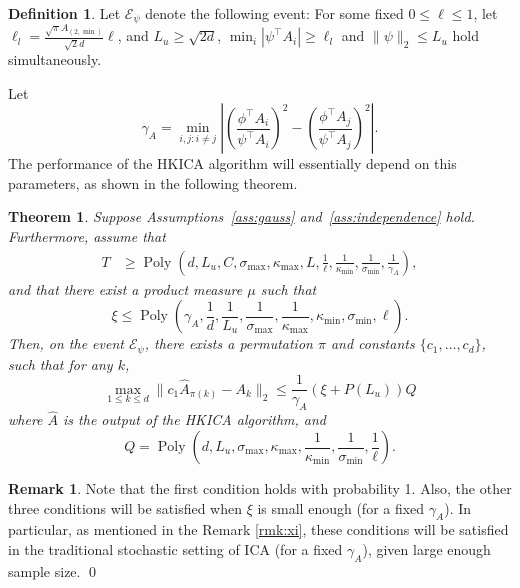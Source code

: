 \documentclass[jmlr]{article}
\newcommand{\Epsi}{\mathcal{E}_{\psi}}
\DeclareMathOperator{\pol}{Poly}
\newcommand{\poly}[1]{\pol\left(#1\right)}
\newtheorem{thm}[lemma]{Theorem}
\theoremstyle{definition}
\newtheorem{definition}[lemma]{Definition}
\newtheorem{remark}[lemma]{Remark}
\begin{document}
\begin{definition}
Let $\Epsi$ denote the following event: For some fixed $0\le \ell\le 1$, let $\ell_l = \frac{\sqrt{\pi}A_{(2,\min)}}{\sqrt{2}d} \ell$, and $ L_u \ge \sqrt{2d}$,
$\min_i |\psi^{\top}A_i| \ge \ell_l$ and $\|\psi\|_2 \le L_u$ hold simultaneously. 
\end{definition}
Let 
\begin{equation}
\label{def:kappa}
\gamma_A =  \min_{i,j: i\neq j} \left\vert \left(\frac{\phi^{\top}A_i}{\psi^{\top}A_i}\right)^2 - \left(\frac{\phi^{\top}A_j}{\psi^{\top}A_j}\right)^2 \right\vert. 
\end{equation}
The performance of the HKICA algorithm will essentially depend on this parameters, as shown in the following theorem.
\begin{thm}
 \label{thm:efficiency} 
Suppose Assumptions~\ref{ass:gauss} and~\ref{ass:independence} hold. 
Furthermore, assume that
\begin{align*}
T & \ge \poly{d, L_u, C, \sigma_{\max},\kappa_{\max}, L,\frac{1}{\ell}, \frac{1}{\kappa_{\min}}, \frac{1}{\sigma_{\min}}, \frac{1}{\gamma_A}},
\end{align*}
and that there exist a product measure $\mu$ such that 
\[
\xi \le \poly{\gamma_A, \frac{1}{d}, \frac{1}{L_u}, \frac{1}{\sigma_{\max}}, \frac{1}{\kappa_{\max}}, \kappa_{\min}, \sigma_{\min}, \ell}.
\] 
Then, on the event $\Epsi$, there exists a permutation $\pi$ and constants $\{c_1,\ldots,c_d\}$, such that for any $k$,
\begin{equation}
\label{eq:HKICA-bound}
  \max_{1\le k\le d}\| c_1\hat{A}_{\pi(k)} - A_k\|_2 \le
  \frac{1}{\gamma_A} (\xi + P(L_u))Q
\end{equation}
where $\hat{A}$ is the output of the HKICA algorithm, and 
\[Q=\poly{d, L_u, \sigma_{\max}, \kappa_{\max}, \frac{1}{\kappa_{\min}}, \frac{1}{\sigma_{\min}}, \frac{1}{\ell}}.\]
 \end{thm}
\begin{remark}
Note that the first condition holds with probability 1. Also, the other three conditions will be satisfied when $\xi$ is small enough (for a fixed $\gamma_A$).
In particular, as mentioned in the Remark \ref{rmk:xi}, these conditions will be satisfied in the traditional stochastic setting of ICA (for a fixed $\gamma_A$), given large enough sample size. \qed
\end{remark}
\end{document}

